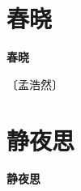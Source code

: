 \documentclass[12pt,UTF-8,openany,fontset=none]{ctexbook}
\begin{document}
\vspace{8pt}
\clearpage


\section{春晓}



\begin{center}
    {\bfseries 春晓}
\end{center}

\begin{center}
    \vspace{10pt}
    
    \begin{large}
        
        〔孟浩然〕
        
    \end{large}
    
    \vspace{8pt}
    
    \begin{huge}
        
        \phantom{。}

        \phantom{。}
        
        \phantom{。}

        \phantom{。}
        
    \end{huge}
    
\end{center}

\vspace{8pt}
\clearpage


\section{静夜思}



\begin{center}
    {\bfseries 静夜思}
\end{center}
\end{document}
